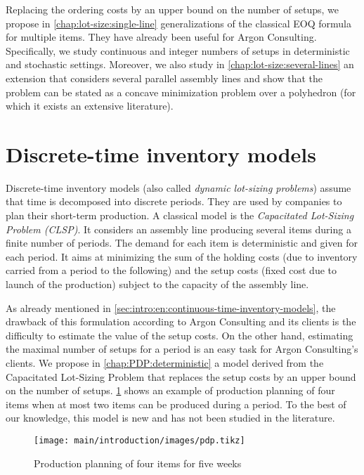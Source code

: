 \medskip


Replacing the ordering costs by an upper bound on the number of setups, we propose in \cref{chap:lot-size:single-line} generalizations of the classical EOQ formula for multiple items.
They have already been useful for Argon Consulting.
Specifically, we study continuous and integer numbers of setups in deterministic and stochastic settings.
Moreover, we also study in \cref{chap:lot-size:several-lines} an extension that considers several parallel assembly lines and show that the problem can be stated as a concave minimization problem over a polyhedron (for which it exists an extensive literature).


\section{Discrete-time inventory models}
\label{sec:intro:en:discrete-time-inventory-models}


Discrete-time inventory models (also called \emph{dynamic lot-sizing problems}) assume that time is decomposed into discrete periods.
They are used by companies to plan their short-term production.
A classical model is the \emph{Capacitated Lot-Sizing Problem (CLSP)}.
It considers an assembly line producing several items during a finite number of periods.
The demand for each item is deterministic and given for each period.
It aims at minimizing the sum of the holding costs (due to inventory carried from a period to the following) and the setup costs (fixed cost due to launch of the production) subject to the capacity of the assembly line.


As already mentioned in \cref{sec:intro:en:continuous-time-inventory-models}, the drawback of this formulation according to Argon Consulting and its clients is the difficulty to estimate the value of the setup costs.
On the other hand, estimating the maximal number of setups for a period is an easy task for Argon Consulting's clients.
We propose in \cref{chap:PDP:deterministic} a model derived from the Capacitated Lot-Sizing Problem that replaces the setup costs by an upper bound on the number of setups.
\cref{fig:intro:en:pdp} shows an example of production planning of four items when at most two items can be produced during a period.
To the best of our knowledge, this model is new and has not been studied in the literature.


\begin{figure}[!ht]
  \centering
  \texttt{[image: main/introduction/images/pdp.tikz]}
  \caption{Production planning of four items for five weeks}
  \label{fig:intro:en:pdp}
\end{figure}


